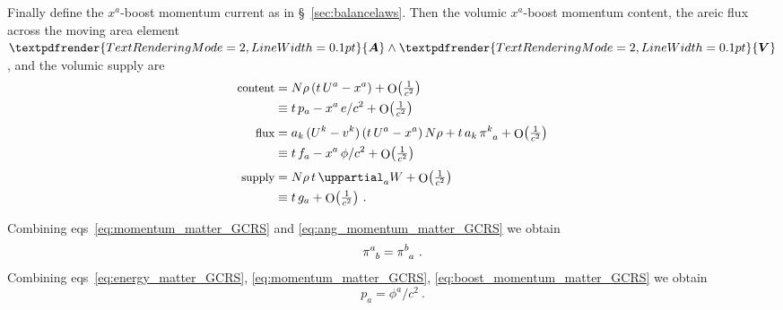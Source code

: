 \documentclass[\ifafour a4paper,12pt,\else a5paper,10pt,\fi%
onecolumn,oneside,article,%
british%
]{memoir}
\makeatletter
\theoremstyle{remark}
\theoremstyle{innote}
\def\sum{\DOTSI\sumop\slimits@}
\newcommand*{\mathte}[1]{\textbf{\textit{\textsf{#1}}}}
\renewcommand*{\bm}[1]{\textpdfrender{TextRenderingMode=2,LineWidth=0.1pt}{\boldsymbol{#1}}}
\newcommand*{\de}{\mathop{}\!\uppartial}%
\DeclareMathOperator{\Ord}{O}%
\newcommand*{\p}{\mathrm{p}}%
\renewcommand*{\|}[1][]{\nonscript\:#1\vert\nonscript\:\mathopen{}}
\newcommand*{\sect}{\S}%
\newcommand*{\eqns}{eqs}%
\newcommand*{\tsum}{\mathop{\textstyle\sum}\nolimits}
\renewcommand*{\i}{{}\indices}
\newcommand*{\yu}{\bm{u}}
\newcommand*{\yo}{\bm{\omega}}
\newcommand*{\yW}{W}
\newcommand*{\yF}{\mathte{F}}
\newcommand*{\yE}{\bm{E}}
\newcommand*{\Oc}[1]{\Ord\bigl(\tfrac{1}{c^{#1}}\bigr)}
\makeatother
\begin{document}
Finally define the $x^{a}$-boost momentum current as in \sect~\ref{sec:balancelaws}. Then the volumic $x^{a}$-boost momentum content, the areic flux across the moving area element $\bm{A}\land\bm{V}$, and the volumic supply are
\begin{equation}
  \label{eq:boost_momentum_matter_GCRS}
  \begin{aligned}
    \text{\small content}&= N\rho\, (t\,U^{a} - x^{a}) + \Oc{2}
    \\
    &\equiv t\,p_{a} - x^{a}\,e/c^{2} + \Oc{2}
    \\[\jot]
    \text{\small flux}&=
    \!\begin{multlined}[t][0.8\linewidth]
      a_{k}\,(U^{k}-v^{k}) \, (t\,U^{a} - x^{a}) \,N\rho +
      t\,a_{k}\,\pi\i{^{k}_{a}}  + \Oc{2}
    \end{multlined}
    \\
    &\equiv t\,f_{a} - x^{a}\,\phi/c^{2} + \Oc{2}
    \\[\jot]
    \text{\small supply}&= N\rho\,t\de_{a}\yW+ \Oc{2} 
    \\
    &\equiv t\,g_{a} + \Oc{2} \ .
  \end{aligned}
\end{equation}

Combining \eqns~\eqref{eq:momentum_matter_GCRS} and \eqref{eq:ang_momentum_matter_GCRS} we obtain
\begin{equation}
  \label{eq:stress_sym_GCRS}
  \pi\i{^{a}_{b}} = \pi\i{^{b}_{a}} \ .
\end{equation}
Combining \eqns~\eqref{eq:energy_matter_GCRS}, \eqref{eq:momentum_matter_GCRS}, \eqref{eq:boost_momentum_matter_GCRS} we obtain
\begin{equation}
  \label{eq:equiv_mom_enflux_GCRS}
  p_{a} = \phi^{a}/c^{2} \ .
\end{equation}


\end{document}
